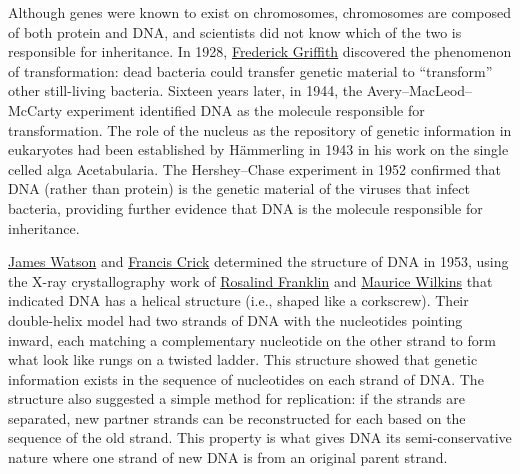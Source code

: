 Although genes were known to exist on chromosomes, chromosomes are composed of both protein and DNA, and scientists did not know which of the two is responsible for inheritance. In 1928, \href{https://en.wikipedia.org/wiki/Frederick_Griffith}{Frederick Griffith} discovered the phenomenon of transformation: dead bacteria could transfer genetic material to ``transform'' other still-living bacteria. Sixteen years later, in 1944, the Avery--MacLeod--McCarty experiment identified DNA as the molecule responsible for transformation. The role of the nucleus as the repository of genetic information in eukaryotes had been established by Hämmerling in 1943 in his work on the single celled alga Acetabularia. The Hershey--Chase experiment in 1952 confirmed that DNA (rather than protein) is the genetic material of the viruses that infect bacteria, providing further evidence that DNA is the molecule responsible for inheritance.

\href{https://en.wikipedia.org/wiki/James_Watson}{James Watson} and \href{https://en.wikipedia.org/wiki/Francis_Crick}{Francis Crick} determined the structure of DNA in 1953, using the X-ray crystallography work of \href{https://en.wikipedia.org/wiki/Rosalind_Franklin}{Rosalind Franklin} and \href{https://en.wikipedia.org/wiki/Maurice_Wilkins}{Maurice Wilkins} that indicated DNA has a helical structure (i.e., shaped like a corkscrew). Their double-helix model had two strands of DNA with the nucleotides pointing inward, each matching a complementary nucleotide on the other strand to form what look like rungs on a twisted ladder. This structure showed that genetic information exists in the sequence of nucleotides on each strand of DNA. The structure also suggested a simple method for replication: if the strands are separated, new partner strands can be reconstructed for each based on the sequence of the old strand. This property is what gives DNA its semi-conservative nature where one strand of new DNA is from an original parent strand.



